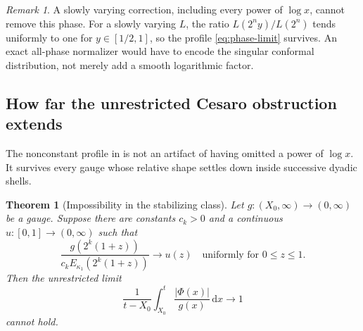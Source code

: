 \documentclass[11pt,oneside]{article}
\newtheorem{theorem}{Theorem}[section]
\theoremstyle{definition}
\theoremstyle{remark}
\newtheorem{remark}[remark]{Remark}
\newcommand{\dd}{\,\mathrm d}
\begin{document}
\begin{remark}
A slowly varying correction, including every power of $\log x$, cannot remove this phase.
For a slowly varying $L$, the ratio $L(2^ny)/L(2^n)$ tends uniformly to one for
$y\in[1/2,1]$, so the profile \eqref{eq:phase-limit} survives.  An exact all-phase
normalizer would have to encode the singular conformal distribution, not merely add a
smooth logarithmic factor.
\end{remark}


\subsection{How far the unrestricted Cesaro obstruction extends}
\label{subsec:stabilizing-gauges}

The nonconstant profile in  is not an artifact of having omitted a
power of $\log x$.  It survives every gauge whose relative shape settles down inside
successive dyadic shells.

\begin{theorem}[Impossibility in the stabilizing class]
\label{thm:stabilizing-impossibility}
Let $g:(X_0,\infty)\to(0,\infty)$ be a gauge.  Suppose there are constants $c_k>0$ and a
continuous $u:[0,1]\to(0,\infty)$ such that
\begin{equation}
 \frac{g(2^k(1+z))}{c_kE_{\kappa_1}(2^k(1+z))}
 \longrightarrow u(z)
 \quad\text{uniformly for }0\le z\le1.
 \label{eq:stabilizing-shape}
\end{equation}
Then the unrestricted limit
\begin{equation}
 \frac1{t-X_0}\int_{X_0}^t\frac{|\Phi(x)|}{g(x)}\dd x\longrightarrow1
 \label{eq:Q2-final}
\end{equation}
cannot hold.
\end{theorem}
\end{document}
